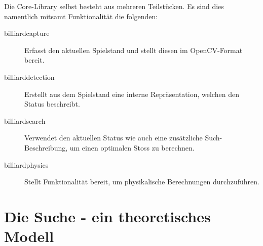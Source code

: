 Die Core-Library selbst besteht aus mehreren Teilstücken. Es sind dies namentlich mitsamt Funktionalität die
folgenden:
\begin{description}
    \item[billiard\textunderscore capture] Erfasst den aktuellen Spielstand und stellt diesen im OpenCV-Format bereit.
    \item[billiard\textunderscore detection] Erstellt aus dem Spielstand eine interne Repräsentation, welchen den Status beschreibt.
    \item[billiard\textunderscore search] Verwendet den aktuellen Status wie auch eine zusätzliche Such-Beschreibung, um einen optimalen
    Stoss zu berechnen.
    \item[billiard\textunderscore physics] Stellt Funktionalität bereit, um physikalische Berechnungen durchzuführen.
\end{description}

\section{Die Suche - ein theoretisches Modell}